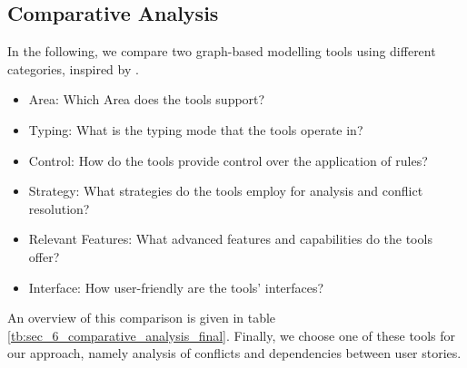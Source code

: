 \subsection{Comparative Analysis}\label{sec_6_comparative_analysis}
In the following, we compare two graph-based modelling tools using different categories, inspired by \cite{ghamarian2012modelling}. 
\begin{itemize}
\item Area: Which Area does the tools support?
\item Typing: What is the typing mode that the tools operate in?
\item Control: How do the tools provide control over the application of rules?
\item Strategy: What strategies do the tools employ for analysis and conflict resolution?
\item Relevant Features: What advanced features and capabilities do the tools offer?
\item Interface: How user-friendly are the tools' interfaces?
\end{itemize}
An overview of this comparison is given in table \ref{tb:sec_6_comparative_analysis_final}. Finally, we choose one of these tools for our approach, namely analysis of conflicts and dependencies between user stories.

